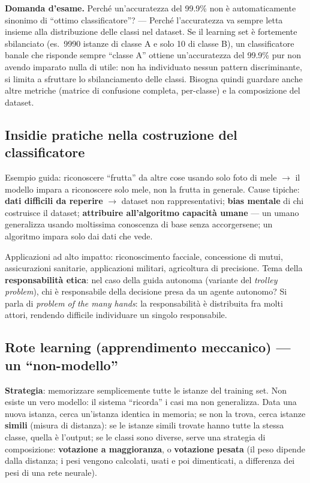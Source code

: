\documentclass[11pt,a4paper]{report}
\newcommand{\domandaesame}[1]{\begin{esame}\textbf{Domanda d'esame.} #1\end{esame}}
\begin{document}
\domandaesame{Perché un'accuratezza del 99.9\% non è automaticamente sinonimo di ``ottimo classificatore''? --- Perché l'accuratezza va sempre letta insieme alla distribuzione delle classi nel dataset. Se il learning set è fortemente sbilanciato (es.\ 9990 istanze di classe A e solo 10 di classe B), un classificatore banale che risponde sempre ``classe A'' ottiene un'accuratezza del 99.9\% pur non avendo imparato nulla di utile: non ha individuato nessun pattern discriminante, si limita a sfruttare lo sbilanciamento delle classi. Bisogna quindi guardare anche altre metriche (matrice di confusione completa, per-classe) e la composizione del dataset.}

\subsection*{Insidie pratiche nella costruzione del classificatore}

Esempio guida: riconoscere ``frutta'' da altre cose usando solo foto di mele $\to$ il modello impara a riconoscere solo mele, non la frutta in generale. Cause tipiche: \textbf{dati difficili da reperire} $\to$ dataset non rappresentativi; \textbf{bias mentale} di chi costruisce il dataset; \textbf{attribuire all'algoritmo capacità umane} --- un umano generalizza usando moltissima conoscenza di base senza accorgersene; un algoritmo impara solo dai dati che vede.

Applicazioni ad alto impatto: riconoscimento facciale, concessione di mutui, assicurazioni sanitarie, applicazioni militari, agricoltura di precisione. Tema della \textbf{responsabilità etica}: nel caso della guida autonoma (variante del \emph{trolley problem}), chi è responsabile della decisione presa da un agente autonomo? Si parla di \emph{problem of the many hands}: la responsabilità è distribuita fra molti attori, rendendo difficile individuare un singolo responsabile.

\subsection*{Rote learning (apprendimento meccanico) --- un ``non-modello''}

\textbf{Strategia}: memorizzare semplicemente tutte le istanze del training set. Non esiste un vero modello: il sistema ``ricorda'' i casi ma non generalizza. Data una nuova istanza, cerca un'istanza identica in memoria; se non la trova, cerca istanze \textbf{simili} (misura di distanza): se le istanze simili trovate hanno tutte la stessa classe, quella è l'output; se le classi sono diverse, serve una strategia di composizione: \textbf{votazione a maggioranza}, o \textbf{votazione pesata} (il peso dipende dalla distanza; i pesi vengono calcolati, usati e poi dimenticati, a differenza dei pesi di una rete neurale).
\end{document}
